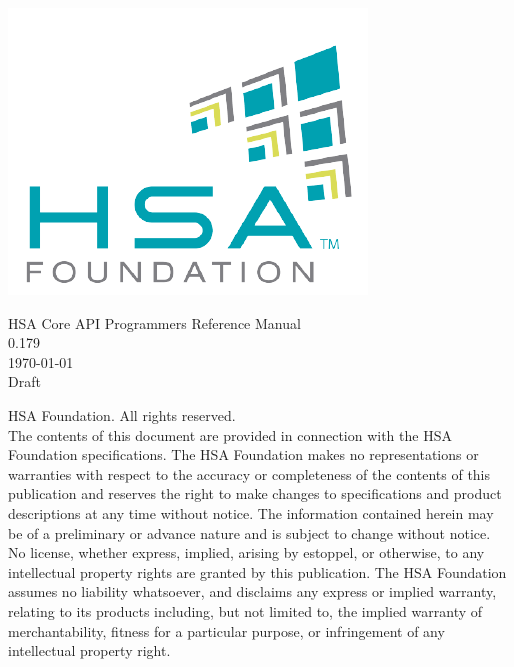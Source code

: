\documentclass[draft]{book}
\begin{document}
\hypersetup{pageanchor=false,citecolor=blue}
\begin{titlepage}
\includegraphics[width=.5\textwidth]{fig/foundation.png}
\vspace*{7cm}
\begin{center}
{\Large HSA Core API Programmers Reference Manual\\[1ex]\large
0.179}\\
\vspace*{1cm}
\vspace*{0.5cm}
{\small \today}\\
\vspace*{0.5cm}
{\small Draft}\\
\end{center}
\end{titlepage}
\thispagestyle{empty} { HSA Foundation. All rights
  reserved.\\} The contents of this document are provided in connection with the
HSA Foundation specifications. The HSA Foundation makes no representations or
warranties with respect to the accuracy or completeness of the contents of this
publication and reserves the right to make changes to specifications and product
descriptions at any time without notice. The information contained herein may be
of a preliminary or advance nature and is subject to change without notice. No
license, whether express, implied, arising by estoppel, or otherwise, to any
intellectual property rights are granted by this publication. The HSA Foundation
assumes no liability whatsoever, and disclaims any express or implied warranty,
relating to its products including, but not limited to, the implied warranty of
merchantability, fitness for a particular purpose, or infringement of any
intellectual property right.  \clearpage {}
\tableofcontents
{}
\clearpage

\setcounter{page}{1}
\end{document}
